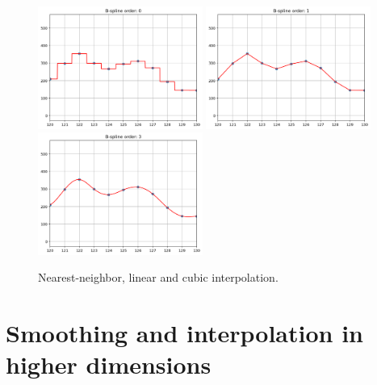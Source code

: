 \documentclass[10pt,twoside]{book}
\begin{document}
\begin{figure}
  \centering
  \includegraphics[width=0.48\textwidth]{interpolation_BSplineOrder0}
  \hfill
  \includegraphics[width=0.48\textwidth]{interpolation_BSplineOrder1}
  \hfill
  \includegraphics[width=0.48\textwidth]{interpolation_BSplineOrder3}
  \caption{Nearest-neighbor, linear and cubic interpolation.}
  \label{fig:interpolation1D}
\end{figure}



\section{Smoothing and interpolation in higher dimensions}
\label{sec:smoothingAndInterpolationND}
\end{document}
